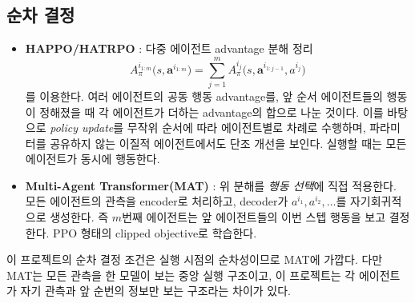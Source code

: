 \documentclass[11pt,a4paper]{article}
\begin{document}
\subsection{순차 결정}
\begin{itemize}
 \item \textbf{HAPPO/HATRPO} \cite{happo}: 다중 에이전트 advantage 분해 정리
 \begin{equation}
 A_\pi^{i_{1:m}}\bigl(s,\boldsymbol a^{i_{1:m}}\bigr)=\sum_{j=1}^m A_\pi^{i_j}\bigl(s,\boldsymbol a^{i_{1:j-1}},a^{i_j}\bigr)
 \end{equation}
 를 이용한다. 여러 에이전트의 공동 행동 advantage를, 앞 순서 에이전트들의 행동이 정해졌을 때 각 에이전트가 더하는 advantage의 합으로 나눈 것이다. 이를 바탕으로 \emph{policy update}를 무작위 순서에 따라 에이전트별로 차례로 수행하며, 파라미터를 공유하지 않는 이질적 에이전트에서도 단조 개선을 보인다. 실행할 때는 모든 에이전트가 동시에 행동한다.
 \item \textbf{Multi-Agent Transformer(MAT)} \cite{mat}: 위 분해를 \emph{행동 선택}에 직접 적용한다. 모든 에이전트의 관측을 encoder로 처리하고, decoder가 \(a^{i_1},a^{i_2},\dots\)를 자기회귀적으로 생성한다. 즉 \(m\)번째 에이전트는 앞 에이전트들의 이번 스텝 행동을 보고 결정한다. PPO 형태의 clipped objective로 학습한다.
\end{itemize}
이 프로젝트의 순차 결정 조건은 실행 시점의 순차성이므로 MAT에 가깝다. 다만 MAT는 모든 관측을 한 모델이 보는 중앙 실행 구조이고, 이 프로젝트는 각 에이전트가 자기 관측과 앞 순번의 정보만 보는 구조라는 차이가 있다.
\end{document}
